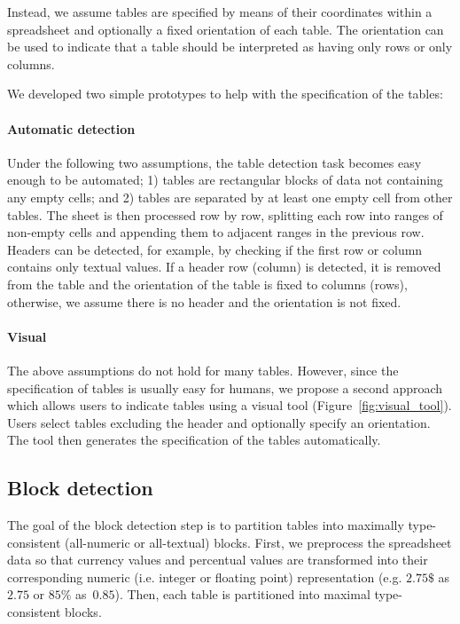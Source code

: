 \documentclass{IEEEtran}
\theoremstyle{definition}
\begin{document}
Instead, we assume tables are specified by means of their coordinates within a spreadsheet and optionally a fixed orientation of each table. The orientation can be used to indicate that a table should be interpreted as having only rows or only columns.

We developed two simple prototypes to help with the specification of the tables:


\paragraph{Automatic detection}
Under the following two assumptions, the table detection task becomes easy enough to be automated; 1) tables are rectangular blocks of data not containing any empty cells; and 2) tables are separated by at least one empty cell from other tables.
The sheet is then processed row by row, splitting each row into ranges of non-empty cells and appending them to adjacent ranges in the previous row.
Headers can be detected, for example, by checking if the first row or column contains only textual values. If a header row (column) is detected, it is removed from the table and the orientation of the table is fixed to columns (rows), otherwise, we assume there is no header and the orientation is not fixed.

\paragraph{Visual}
The above assumptions do not hold for many tables. However, since the specification of tables is usually easy for humans, we propose a second approach which allows users to indicate tables using a visual tool (Figure~\ref{fig:visual_tool}).
Users select tables excluding the header and optionally specify an orientation.
The tool then generates the specification of the tables automatically.





\subsection{Block detection} \label{sec:make_groups}
The goal of the block detection step is to partition tables into maximally type-consistent (all-numeric or all-textual) blocks.
First, we preprocess the spreadsheet data so that currency values and percentual values are transformed into their corresponding numeric (i.e. integer or floating point) representation (e.g. $2.75 \$$ as $2.75$ or $85\%$ as~$0.85$).
Then, each table is partitioned into maximal type-consistent blocks.
\end{document}
